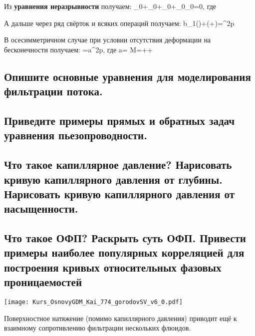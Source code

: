 \documentclass[main.tex]{subfiles}
\begin{document}
Из \textbf{уравнения неразрывности} получаем:
\beq
\varphi_0+\rho_0+\rho_0\pmb{\nabla}\cdot{}+\rho_0\varphi_0=0,
\eeq
где
\beq
{}\equiv\pmb{\nabla}\cdot{}
\eeq

А дальше через ряд свёрток и всяких операций получаем:
\beq
b_1(\pmb{\varepsilon})+\left(+\right)=\pmb{\nabla}^2p
\eeq

В осесимметричном случае при условии отсутствия деформации на бесконечности получаем:
\beq
{}=a\pmb{\nabla}^2p,
\eeq
где
\beq
a= M=++
\eeq

\newpage

\subsection{Опишите основные уравнения для моделирования фильтрации потока.}

\newpage

\subsection{Приведите примеры прямых и обратных задач уравнения пьезопроводности.}

\newpage

\subsection{Что такое капиллярное давление? Нарисовать кривую капиллярного давления от глубины. Нарисовать кривую капиллярного давления от насыщенности.}

\newpage

\subsection{Что такое ОФП? Раскрыть суть ОФП. Привести примеры наиболее популярных корреляцией для построения кривых относительных фазовых проницаемостей}

\texttt{[image: Kurs\_OsnovyGDM\_Kai\_774\_gorodovSV\_v6\_0.pdf]}

Поверхностное натяжение (помимо капиллярного давления) приводит ещё к взаимному сопротивлению фильтрации нескольких флюидов.
\end{document}
